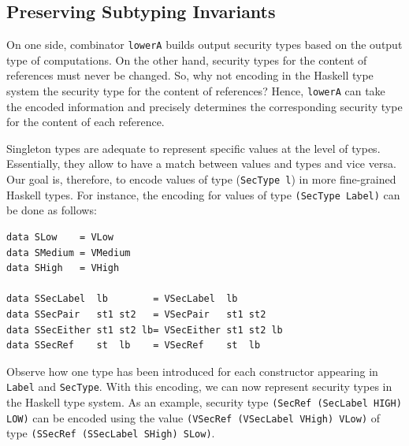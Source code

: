 \documentclass[times, 10pt,twocolumn]{article}
\begin{document}
\subsection{Preserving Subtyping Invariants}

On one side, combinator \texttt{lowerA} builds output security types
based on the output type of computations. 
On the other hand, security types for the content of references must
never be changed. So, why not encoding in the Haskell type system 
the security type for the content of references? 
Hence, \texttt{lowerA} can take
the encoded information and precisely determines the 
corresponding security type for the content of each reference. 

Singleton types \cite{pierce:AdvanceTypeBook} are adequate to represent specific 
values at the level of types. Essentially, they allow to have a match 
between values and types and vice versa. 
Our goal is, therefore, to 
encode values of type
(\texttt{SecType l}) in more fine-grained Haskell types. For instance, 
the encoding for values of type \texttt{(SecType Label)}
can be done as follows:
\begin{Verbatim}[fontsize=\footnotesize]
data SLow    = VLow
data SMedium = VMedium
data SHigh   = VHigh

data SSecLabel  lb        = VSecLabel  lb
data SSecPair   st1 st2   = VSecPair   st1 st2
data SSecEither st1 st2 lb= VSecEither st1 st2 lb
data SSecRef    st  lb    = VSecRef    st  lb
\end{Verbatim}
Observe how one type has been introduced for each constructor appearing in 
\texttt{Label} and \texttt{SecType}. With this encoding,  
we can now represent security types in the Haskell type system. 
As an example, security type 
\texttt{(SecRef (SecLabel HIGH) LOW)} can be encoded using the 
value \texttt{(VSecRef (VSecLabel VHigh) VLow)} of type 
\texttt{(SSecRef (SSecLabel SHigh) SLow)}. %
\end{document}
